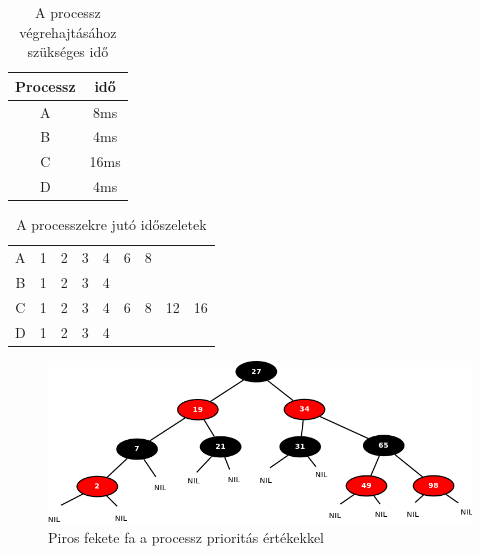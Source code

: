





\begin{table}[h]
\centering
\caption{A processz végrehajtásához szükséges idő}
\label{tab:processtimes}
\begin{tabular}{|c|c|}
\hline
Processz & idő \\
\hline
A & 8ms \\
B & 4ms \\
C & 16ms \\
D & 4ms \\
\hline
\end{tabular}
\end{table}

\begin{table}[h]
\centering
\caption{A processzekre jutó időszeletek}
\label{tab:timeslices}
\begin{tabular}{|c|c|c|c|c|c|c|c|c|}
\hline
A & 1 & 2 & 3 & 4 & 6 & 8 & & \\
B & 1 & 2 & 3 & 4 & & & & \\
C & 1 & 2 & 3 & 4 & 6 & 8 & 12 & 16 \\
D & 1 & 2 & 3 & 4 & & & & \\
\hline
\end{tabular}
\end{table}

\begin{figure}[h]
\centering
\includegraphics[width=\textwidth]{images/rb_tree.png}
\caption{Piros fekete fa a processz prioritás értékekkel}
\label{fig:rb_tree}
\end{figure}
